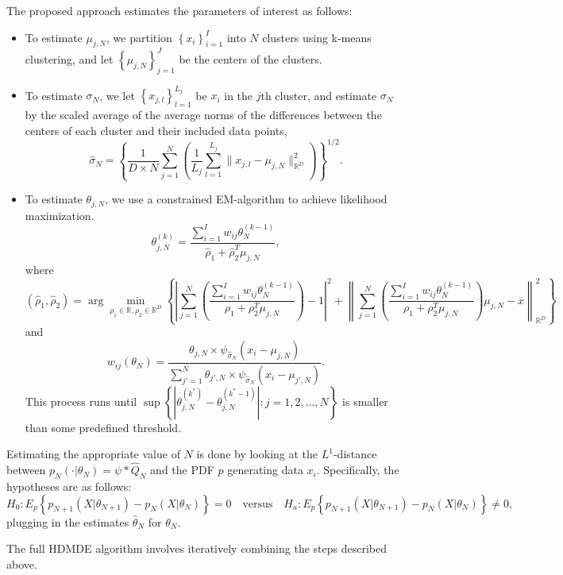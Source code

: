 The proposed approach estimates the parameters of interest as follows:
\begin{itemize}
  \label{item:hdmde_approach}
  \item To estimate $\mu_{j, N}$, we partition $\left\{x_i\right\}_{i=1}^{I}$ into $N$ clusters using k-means clustering, and let $\left\{\mu_{j, N}\right\}_{j=1}^{J}$ be the centers of the clusters.
  \item To estimate $\sigma_N$, we let $\left\{x_{j, l}\right\}_{l=1}^{L_j}$ be $x_i$ in the $j$th cluster, and estimate $\sigma_N$ by the scaled average of the average norms of the differences between the centers of each cluster and their included data points,
    \[%
    \hat{\sigma}_N = \left\{\frac{1}{D \times N}\sum_{j=1}^{N}\left(\frac{1}{L_j}\sum_{l=1}^{L_j}\|x_{j, l} - \mu_{j, N}\|_{\mathbb{R}^{D}}^2\right)\right\}^{1/2}
    .\]%
  \item To estimate $\theta_{j, N}$, we use a constrained EM-algorithm to achieve likelihood maximization.
    \[%
      \theta_{j, N}^{(k)} = \frac{\sum_{i=1}^{I}w_{ij}\theta_N^{(k-1)}}{\hat{\rho}_1 + \hat{\rho}_2^{T}\mu_{j, N}}
    ,\]%
    where
    \[%
      (\hat{\rho}_1, \hat{\rho}_2) = \arg \min_{\rho_1 \in \mathbb{R}, \rho_2 \in \mathbb{R}^{D}}\left\{\left|\sum_{j=1}^{N}\left(\frac{\sum_{i=1}^{I}w_{ij}\theta_N^{(k-1)}}{\rho_1 + \rho_2^{T}\mu_{j, N}}\right) - 1\right|^2 + \left\|\sum_{j=1}^{N}\left(\frac{\sum_{i=1}^{I}w_{ij}\theta_N^{(k-1)}}{\rho_1 + \rho_2^{T}\mu_{j, N}}\right)\mu_{j, N} - \overline{x}\right\|_{\mathbb{R}^{D}}^2\right\}
    \]%
    and
    \[%
      w_{ij}(\theta_N) = \frac{\theta_{j, N} \times \psi_{\hat{\sigma}_N}(x_i - \mu_{j, N})}{\sum_{j' = 1}^{N}\theta_{j', N} \times \psi_{\hat{\sigma}_N}(x_i - \mu_{j', N})}
    .\]%
    This process runs until $\sup\left\{\left|\theta_{j, N}^{(k^{*})} - \theta_{j, N}^{(k^{*} - 1)}\right|: j = 1, 2, \dots, N\right\}$ is smaller than some predefined threshold.
\end{itemize}

Estimating the appropriate value of $N$ is done by looking at the $L^{1}$-distance between $p_N(\cdot | \theta_N) = \psi * \hat{Q}_N$ and the PDF $p$ generating data $x_i$. Specifically, the hypotheses are as follows:
\[%
H_0: E_p\left\{p_{N+1}(X | \theta_{N + 1}) - p_N(X | \theta_N)\right\} = 0 \quad \text{versus} \quad H_a: E_p\left\{p_{N + 1}(X | \theta_{N + 1}) - p_N(X | \theta_N)\right\} \neq 0
,\]%
plugging in the estimates $\hat{\theta}_N$ for $\theta_N$.

The full HDMDE algorithm involves iteratively combining the steps described above.

